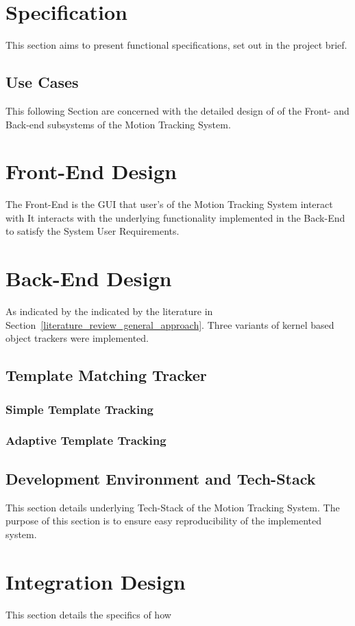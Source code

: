 \section{Specification}
This section aims to present functional specifications, set out in the
project brief.

\subsection{Use Cases}
This following Section are concerned with the detailed design of of the Front- and Back-end
subsystems of the Motion Tracking System.

\section{Front-End Design}
The Front-End is the GUI that user's of the Motion Tracking System interact with 
It interacts with the underlying functionality implemented in the Back-End to
satisfy the System User Requirements. 

\section{Back-End Design}
As indicated by the indicated by the literature in
Section~\ref{literature_review_general_approach}. Three variants of kernel based
object trackers were implemented.

\subsection{Template Matching Tracker}

\subsubsection{Simple Template Tracking}

\subsubsection{Adaptive Template Tracking}


\subsection{Development Environment and Tech-Stack}
This section details underlying Tech-Stack of the Motion Tracking System. The
purpose of this section is to ensure easy reproducibility of the implemented
system.

\subsubsection{}

\section{Integration Design}
This section details the specifics of how 





